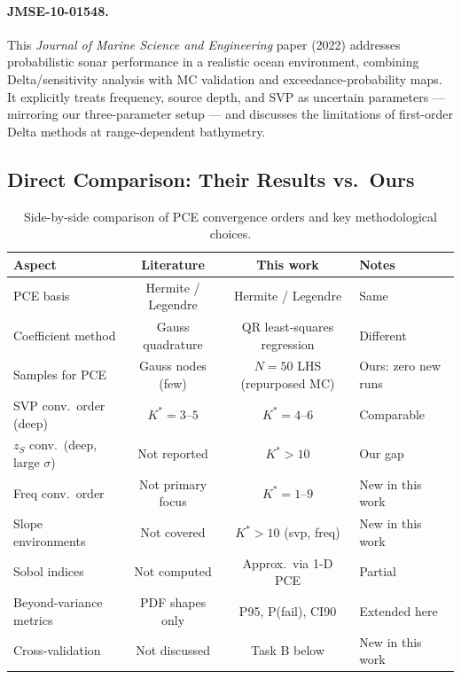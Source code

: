 \documentclass[11pt,a4paper]{article}
\begin{document}
\paragraph{JMSE-10-01548.}
This \emph{Journal of Marine Science and Engineering} paper (2022) addresses
probabilistic sonar performance in a realistic ocean environment, combining
Delta/sensitivity analysis with MC validation and exceedance-probability maps.
It explicitly treats frequency, source depth, and SVP as uncertain parameters —
mirroring our three-parameter setup — and discusses the limitations of first-order
Delta methods at range-dependent bathymetry.

\subsection{Direct Comparison: Their Results vs.\ Ours}
\label{sec:comparison}

\begin{table}[H]
  \centering
  \caption{Side-by-side comparison of PCE convergence orders and key methodological choices.}
  \label{tab:lit_comparison}
  \begin{tabular}{lccl}
    \toprule
    Aspect & Literature & This work & Notes \\
    \midrule
    PCE basis & Hermite / Legendre & Hermite / Legendre & Same \\
    Coefficient method & Gauss quadrature & QR least-squares regression & Different \\
    Samples for PCE & Gauss nodes (few) & $N=50$ LHS (repurposed MC) & Ours: zero new runs \\
    SVP conv.\ order (deep) & $K^* = 3$--$5$ & $K^* = 4$--$6$ & Comparable \\
    $z_S$ conv.\ (deep, large $\sigma$) & Not reported & $K^* > 10$ & Our gap \\
    Freq conv.\ order & Not primary focus & $K^* = 1$--$9$ & New in this work \\
    Slope environments & Not covered & $K^* > 10$ (svp, freq) & New in this work \\
    Sobol indices & Not computed & Approx.\ via 1-D PCE & Partial \\
    Beyond-variance metrics & PDF shapes only & P95, P(fail), CI90 & Extended here \\
    Cross-validation & Not discussed & Task B below & New in this work \\
    \bottomrule
  \end{tabular}
\end{table}
\end{document}
